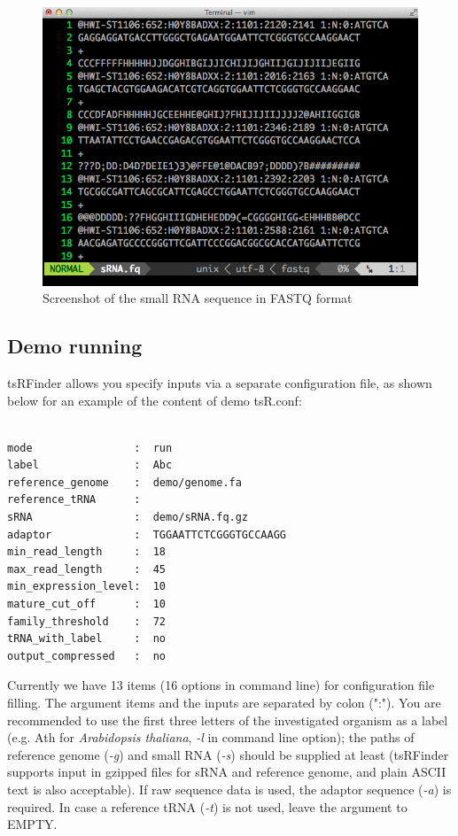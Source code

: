 \documentclass[11pt, a4paper]{article}
\begin{document}
\begin{figure}[htbp]
\begin{center}
\includegraphics[width=12cm]{fastq.png}
\caption{Screenshot of the small RNA sequence in FASTQ format} 
\label{fastq}
\end{center}
\end{figure}

\subsection{Demo running}

tsRFinder allows you specify inputs via a separate configuration file, as shown below for an example of the content of demo tsR.conf:

{\footnotesize \begin{tcolorbox}[colback=blue!5!white,colframe=blue!75!black,title=Demo configuration file for tsRFinder: demo/tsR.conf]
\begin{verbatim}

mode                :  run
label               :  Abc
reference_genome    :  demo/genome.fa
reference_tRNA      :
sRNA                :  demo/sRNA.fq.gz
adaptor             :  TGGAATTCTCGGGTGCCAAGG
min_read_length     :  18
max_read_length     :  45
min_expression_level:  10
mature_cut_off      :  10
family_threshold    :  72
tRNA_with_label     :  no
output_compressed   :  no

\end{verbatim}
\end{tcolorbox}}

Currently we have 13 items (16 options in command line) for configuration file filling. The argument items and the inputs are separated by colon (":"). You are recommended to use the first three letters of the investigated organism as a label (e.g. Ath for \textit{Arabidopsis thaliana}, \emph{-l} in command line option); the paths of reference genome (\emph{-g}) and small RNA (\emph{-s}) should be supplied at least (tsRFinder supports input in gzipped files for sRNA and reference genome, and plain ASCII text is also acceptable). If raw sequence data is used, the adaptor sequence (\emph{-a}) is required. In case a reference tRNA (\emph{-t}) is not used, leave the argument to EMPTY.
\end{document}
